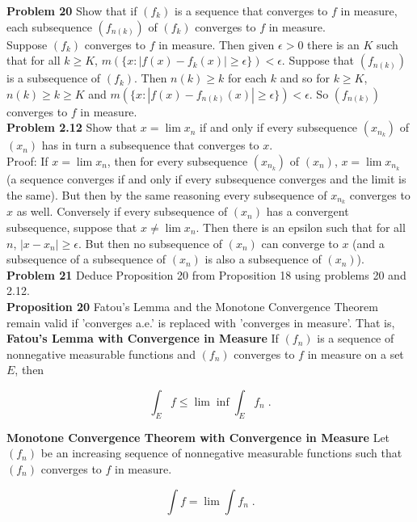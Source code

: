 \documentclass[a4paper]{article}
\begin{document}
{\bf Problem 20} Show that if $(f_k)$ is a sequence that converges to $f$ in measure, each subsequence $(f_{n(k)})$ of $(f_k)$ converges to $f$ in measure. \\

Suppose $(f_k)$ converges to $f$ in measure. Then given $\epsilon >0$ there is an $K$ such that for all $k\geq K$, $m(\{x : |f(x) - f_k(x)| \geq \epsilon \}) < \epsilon$. Suppose that $(f_{n(k)})$ is a subsequence of $(f_k)$. Then $n(k) \geq k$ for each $k$ and so for $k\geq K$, $n(k) \geq k \geq K$ and $m(\{x : |f(x) - f_{n(k)}(x)| \geq \epsilon \})<\epsilon$. So $(f_{n(k)})$ converges to $f$ in measure.\\

{\bf Problem 2.12} Show that $x = \lim x_n$ if and only if every subsequence $(x_{n_k})$ of $(x_n)$ has in turn a subsequence that converges to $x$. \\

Proof: If $x = \lim x_n$, then for every subsequence $(x_{n_k})$ of $(x_n)$, $x= \lim x_{n_k}$ (a sequence converges if and only if every subsequence converges and the limit is the same). But then by the same reasoning every subsequence of $x_{n_k}$ converges to $x$ as well. Conversely if every subsequence of $(x_n)$ has a convergent subsequence, suppose that $x \neq \lim x_n$. Then there is an epsilon such that for all $n$, $|x - x_n| \geq \epsilon$. But then no subsequence of $(x_n)$ can converge to $x$ (and a subsequence of a subsequence of $(x_n)$ is also a subsequence of $(x_n)$). \\

{\bf Problem 21} Deduce Proposition 20 from Proposition 18 using problems 20 and 2.12. \\

{\bf Proposition 20} Fatou's Lemma and the Monotone Convergence Theorem remain valid if 'converges a.e.' is replaced with 'converges in measure'. That is,\\

{\bf Fatou's Lemma with Convergence in Measure} If $(f_n)$ is a sequence of nonnegative measurable functions and $(f_n)$ converges to $f$ in measure on a set $E$, then

$$\int_E f \leq \lim \inf \int_E f_n \;.$$

{\bf Monotone Convergence Theorem with Convergence in Measure} Let $(f_n)$ be an increasing sequence of nonnegative measurable functions such that $(f_n)$ converges to $f$ in measure. 

$$\int f = \lim \int f_n \;.$$ 
\end{document}
